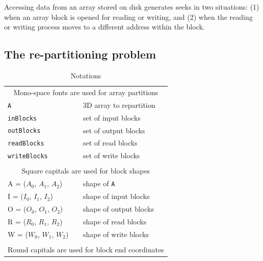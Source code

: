 \documentclass[sigconf, nonacm]{acmart}
\begin{document}
Accessing data from an array stored on disk generates seeks in two
situations: (1) when an array block is opened for reading or writing, and
(2) when the reading or writing process moves to a different address within
the block.

\subsection{The re-partitioning problem}

\begin{table}
  \caption{Notations}
  \begin{tabular}{ll}
    \multicolumn{2}{c}{\cellcolor{black!25}Mono-space fonts are used for array partitions}\\
    \texttt{A} & 3D array to repartition \\
    \texttt{inBlocks} & set of input blocks \\
    \texttt{outBlocks} & set of output blocks \\
    \texttt{readBlocks} & set of read blocks \\
    \texttt{writeBlocks} & set of write blocks \\

    &\\
    \multicolumn{2}{c}{\cellcolor{black!25}Square capitals are used for block shapes}\\
    A = ($A_0$, $A_1$, $A_2$) & shape of \texttt{A}\\
    I = ($I_0$, $I_1$, $I_2$)& shape of input blocks\\
    O = ($O_0$, $O_1$, $O_2$) & shape of output blocks\\
    R = ($R_0$, $R_1$, $R_2$) & shape of read blocks\\
    W = ($W_0$, $W_1$, $W_2$) & shape of write blocks\\
    &\\
    \multicolumn{2}{c}{\cellcolor{black!25}Round capitals are used for block end coordinates}\\


\end{tabular}
\end{table}
\end{document}
